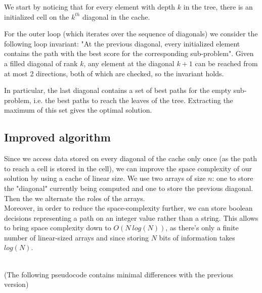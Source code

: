 \documentclass{article}
\begin{document}
We start by noticing that for every element with depth $k$ in the tree, there is an initialized cell on the $k^{th}$ diagonal in the cache.

For the outer loop (which iterates over the sequence of diagonals) we consider the following loop invariant: "At the previous diagonal, every initialized element contains the path with the best score for the corresponding sub-problem". Given a filled diagonal of rank $k$, any element at the diagonal $k+1$ can be reached from at most 2 directions, both of which are checked, so the invariant holds.

In particular, the last diagonal contains a set of best paths for the empty sub-problem, i.e. the best paths to reach the leaves of the tree. Extracting the maximum of this set gives the optimal solution.


\subsection{Improved algorithm}
Since we access data stored on every diagonal of the cache only once (as the path to reach a cell is stored in the cell), we can improve the space complexity of our solution by using a cache of linear size. We use two arrays of size $n$: one to store the "diagonal" currently being computed and one to store the previous diagonal. Then the we alternate the roles of the arrays.
\\
Moreover, in order to reduce the space-complexity further, we can store boolean decisions representing a path on an integer value rather than a string.
This allows to bring space complexity down to $O(N\ log(N))$, as there's only a finite number of linear-sized arrays and since storing $N$ bits of information takes $log(N)$.

\\
(The following pseudocode contains minimal differences with the previous version)
\end{document}
